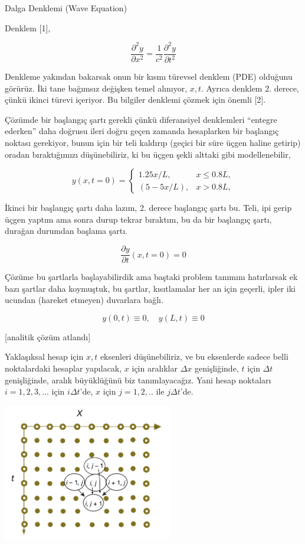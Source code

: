 \documentclass[12pt,fleqn]{article}\usepackage{../../common}
\begin{document}
Dalga Denklemi (Wave Equation)

Denklem [1],

$$
\frac{\partial^2 y}{\partial x^2}  =
\frac{1}{c^2}\frac{\partial^2 y}{\partial t^2}
$$

Denkleme yakından bakarsak onun bir kısmı türevsel denklem (PDE) olduğunu
görürüz. İki tane bağımsız değişken temel alınıyor, $x,t$. Ayrıca denklem
2. derece, çünkü ikinci türevi içeriyor. Bu bilgiler denklemi çözmek için
önemli [2].

Çözümde bir başlangıç şartı gerekli çünkü diferansiyel denklemleri ``entegre
ederken'' daha doğrusu ileri doğru geçen zamanda hesaplarken bir başlangıç
noktası gerekiyor, bunun için bir teli kaldırıp (geçici bir süre üçgen haline
getirip) oradan bıraktığımızı düşünebiliriz, ki bu üçgen şekli alttaki gibi
modellenebilir,

$$
y(x,t=0)=\begin{cases}
1.25 x/L , &x\leq 0.8 L ,\\
(5-5x/L), &x> 0.8 L,
\end{cases} 
$$

İkinci bir başlangıç şartı daha lazım, 2. derece başlangıç şartı bu. Teli, ipi
gerip üçgen yaptım ama sonra durup tekrar bıraktım, bu da bir başlangıç şartı,
durağan durumdan başlama şartı.

$$
\frac{\partial y} {\partial t}(x,t=0) =0
$$

Çözüme bu şartlarla başlayabilirdik ama baştaki problem tanımını hatırlarsak ek
bazı şartlar daha koymuştuk, bu şartlar, kısıtlamalar her an için geçerli,
ipler iki ucundan (hareket etmeyen) duvarlara bağlı.

$$
y(0,t) \equiv 0, \quad y(L,t) \equiv 0
$$

[analitik çözüm atlandı]

Yaklaşıksal hesap için $x,t$ eksenleri düşünebiliriz, ve bu eksenlerde
sadece belli noktalardaki hesaplar yapılacak, $x$ için aralıklar $\Delta x$
genişliğinde, $t$ için $\Delta t$ genişliğinde, aralık büyüklüğünü biz
tanımlayacağız. Yani hesap noktaları $i=1,2,3,...$ için $i \Delta t$'de,
$x$ için $j=1,2,..$ ile $j \Delta t$'de.

\includegraphics[width=20em]{compscieng_app17wave_03.png}
\end{document}
